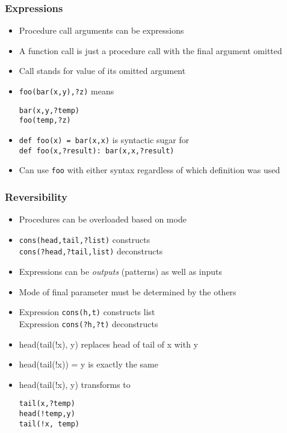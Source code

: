 \documentclass[12pt]{beamer}
\begin{document}
\begin{frame}
\frametitle{Expressions}
\begin{itemize}
\item Procedure call arguments can be expressions
\item A function call is just a procedure call with the final argument omitted
\item Call stands for value of its omitted argument
\item \texttt{foo(bar(x,y),?z)} \quad means \quad
  \begin{minipage}[c]{0.4\linewidth}
  \texttt{bar(x,y,?temp)} \\
  \texttt{foo(temp,?z)}
  \end{minipage}
\item \texttt{def foo(x) = bar(x,x)} is syntactic sugar for \\
\texttt{def foo(x,?result): bar(x,x,?result)}
\item Can use \texttt{foo} with either syntax regardless of which
  definition was used
\end{itemize}
\end{frame}


\begin{frame}
\frametitle{Reversibility}
\begin{itemize}
\item Procedures can be overloaded based on mode
\item \texttt{cons(head,tail,?list)}  constructs \\
\texttt{cons(?head,?tail,list)}  deconstructs \\
\item Expressions can be \emph{outputs} (patterns) as well as inputs
\item Mode of final parameter must be determined by the others
\item Expression \texttt{cons(h,t)} constructs list \\
Expression \texttt{cons(?h,?t)} deconstructs
\item head(tail(!x), y) replaces head of tail of x with y
\item head(tail(!x)) = y is exactly the same
\item head(tail(!x), y) \quad transforms to \quad
  \begin{minipage}[c]{0.4\linewidth}
  \texttt{tail(x,?temp)} \\
  \texttt{head(!temp,y)} \\
  \texttt{tail(!x, temp)}
  \end{minipage}
\end{itemize}
\end{frame}
\end{document}
